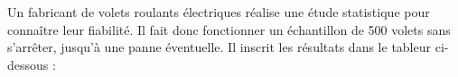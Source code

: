 \documentclass[10pt]{article}
\begin{document}
\setlength\parindent{0mm}
\pagestyle{fancy}
\thispagestyle{empty}
    
    
    




\medskip 



 Un fabricant de volets roulants électriques réalise une étude statistique pour connaître leur fiabilité. Il fait donc fonctionner un échantillon de 500 volets sans s'arrêter, jusqu'à une panne éventuelle. Il inscrit les résultats dans le tableur ci-dessous :
\end{document}

